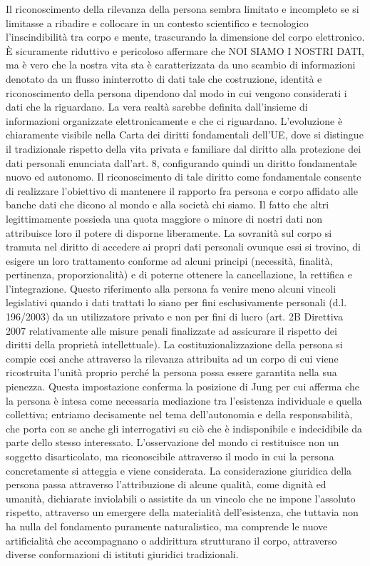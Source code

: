 Il riconoscimento della rilevanza della persona sembra limitato e incompleto se si limitasse a ribadire e collocare in un contesto scientifico e tecnologico l’inscindibilità tra corpo e mente, trascurando la dimensione del corpo elettronico.
È sicuramente riduttivo e pericoloso affermare che NOI SIAMO I NOSTRI DATI, ma è vero che la nostra vita sta è caratterizzata da uno scambio di informazioni denotato da un flusso ininterrotto di dati tale che costruzione, identità e riconoscimento della persona dipendono dal modo in cui vengono considerati i dati che la riguardano. 
La vera realtà sarebbe definita dall’insieme di informazioni organizzate elettronicamente e che ci riguardano.
L’evoluzione è chiaramente visibile nella Carta dei diritti fondamentali dell’UE, dove si distingue il tradizionale rispetto della vita privata e familiare dal diritto alla protezione dei dati personali enunciata dall’art. 8, configurando quindi un diritto fondamentale nuovo ed autonomo.
Il riconoscimento di tale diritto come fondamentale consente di realizzare l’obiettivo di mantenere il rapporto fra persona e corpo affidato alle banche dati che dicono al mondo e alla società chi siamo. Il fatto che altri legittimamente possieda una quota maggiore o minore di nostri dati non attribuisce loro il potere di disporne liberamente. La sovranità sul corpo si tramuta nel diritto di accedere ai propri dati personali ovunque essi si trovino, di esigere un loro trattamento conforme ad alcuni principi (necessità, finalità, pertinenza, proporzionalità) e di poterne ottenere la cancellazione, la rettifica e l’integrazione. 
Questo riferimento alla persona fa venire meno alcuni vincoli legislativi quando i dati trattati lo siano per fini esclusivamente personali (d.l. 196/2003) da un utilizzatore privato e non per fini di lucro (art. 2B Direttiva 2007 relativamente alle misure penali finalizzate ad assicurare il rispetto dei diritti della proprietà intellettuale).
La costituzionalizzazione della persona si compie cosi anche attraverso la rilevanza attribuita ad un corpo di cui viene ricostruita l’unità proprio perché la persona possa essere garantita nella sua pienezza.
Questa impostazione conferma la posizione di Jung per cui afferma che la persona è intesa come necessaria mediazione tra l’esistenza individuale e quella collettiva; entriamo decisamente nel tema dell’autonomia e della responsabilità, che porta con se anche gli interrogativi su ciò che è indisponibile e indecidibile da parte dello stesso interessato. 
L’osservazione del mondo ci restituisce non un soggetto disarticolato, ma riconoscibile attraverso il modo in cui la persona concretamente si atteggia e viene considerata. La considerazione giuridica della persona passa attraverso l’attribuzione di alcune qualità, come dignità ed umanità, dichiarate inviolabili o assistite da un vincolo che ne impone l’assoluto rispetto, attraverso un emergere della materialità dell’esistenza, che tuttavia non ha nulla del fondamento puramente naturalistico, ma comprende le nuove artificialità che accompagnano o addirittura strutturano il corpo, attraverso diverse conformazioni di istituti giuridici tradizionali.
